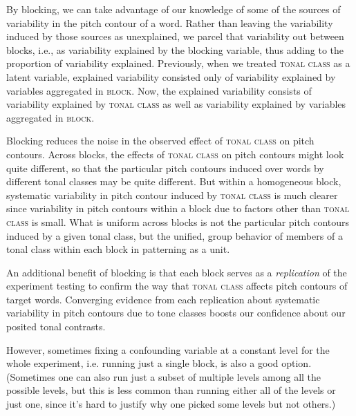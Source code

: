 \documentclass[12pt]{article}
\begin{document}
By blocking, we can take advantage of our knowledge of some of the
sources of variability in the pitch contour of a word. Rather than
leaving the variability induced by those sources as unexplained, we
parcel that variability out between blocks, i.e., as variability explained
by the blocking variable, thus adding to the proportion of variability
explained. Previously, when we treated \textsc{tonal class} as a
latent variable, explained variability consisted only of variability
explained by variables aggregated in \textsc{block}. Now, the explained variability consists of variability
explained by \textsc{tonal class} as well as variability explained by
variables aggregated in \textsc{block}. 

Blocking reduces the noise in the
observed effect of \textsc{tonal class} on pitch contours. Across
blocks, the effects of \textsc{tonal class} on pitch contours might
look quite different, so that the
particular pitch contours induced over words by different tonal
classes may be quite different. But within a
homogeneous block, systematic variability in pitch contour induced by
\textsc{tonal class} is much clearer since variability in pitch
contours within a block due to factors other than \textsc{tonal class} is
small. What is uniform across blocks is not the particular pitch
contours induced by a given tonal class, but the unified, group
behavior of members of a tonal class within each block in patterning
as a unit. 

An
additional benefit of blocking is that each block serves as a
\textit{replication} of the experiment testing to confirm the way that
\textsc{tonal class} affects pitch contours of target
words. Converging evidence from each replication about systematic
variability in pitch contours due to tone classes boosts our
confidence about our posited tonal contrasts. 

However, sometimes
fixing a confounding variable at a constant level for the whole
experiment, i.e. running just a single block, is also a good
option. (Sometimes one can also run just a subset of multiple levels among all the
possible levels, but this is less common than running either all of
the levels or just one, since it's hard to justify why one picked some levels
but not others.) 
\end{document}
